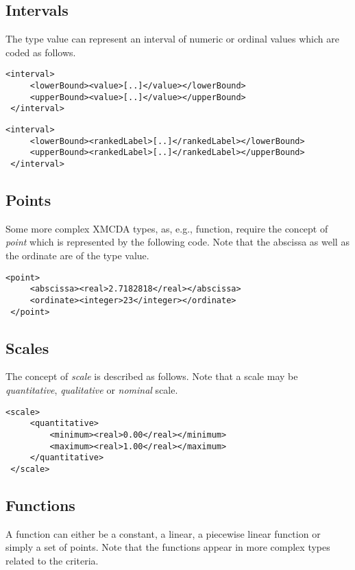 \documentclass[a4paper,oneside,10 pt]{article}
\newcommand{\XMCDA}{{\asciifamily XMCDA}\xspace}
\newcommand{\code}{\asciifamily}
\begin{document}
\subsection{Intervals}

The type {\code value} can represent an interval of numeric or ordinal values which are coded as follows.
{\code
\begin{lstlisting}[style=prototype]
 <interval>
	 <lowerBound><value>[..]</value></lowerBound>
	 <upperBound><value>[..]</value></upperBound>
 </interval>
\end{lstlisting}

\begin{lstlisting}[style=prototype]
 <interval>
	 <lowerBound><rankedLabel>[..]</rankedLabel></lowerBound>
	 <upperBound><rankedLabel>[..]</rankedLabel></upperBound>
 </interval>
\end{lstlisting} 
}
\subsection{Points}

Some more complex \XMCDA types, as, e.g., {\code function}, require the concept of \textit{point} which is represented by the following code. Note that the abscissa as well as the ordinate are of the type {\code value}. 
{\code
\begin{lstlisting}[style=prototype]
 <point>
	 <abscissa><real>2.7182818</real></abscissa>
	 <ordinate><integer>23</integer></ordinate>
 </point>
\end{lstlisting}
}

\subsection{Scales}

The concept of {\em scale} is described as follows. Note that a scale may be {\em quantitative}, {\em qualitative} or {\em nominal} scale.
{\code
\begin{lstlisting}[style=prototype]
 <scale>
	 <quantitative>
		 <minimum><real>0.00</real></minimum>
		 <maximum><real>1.00</real></maximum>
	 </quantitative>
 </scale>
\end{lstlisting}
}

\subsection{Functions}

A {\code function} can either be a constant, a linear, a piecewise linear function or simply a set of points. Note that the functions appear in more complex types related to the criteria. 
\end{document}
